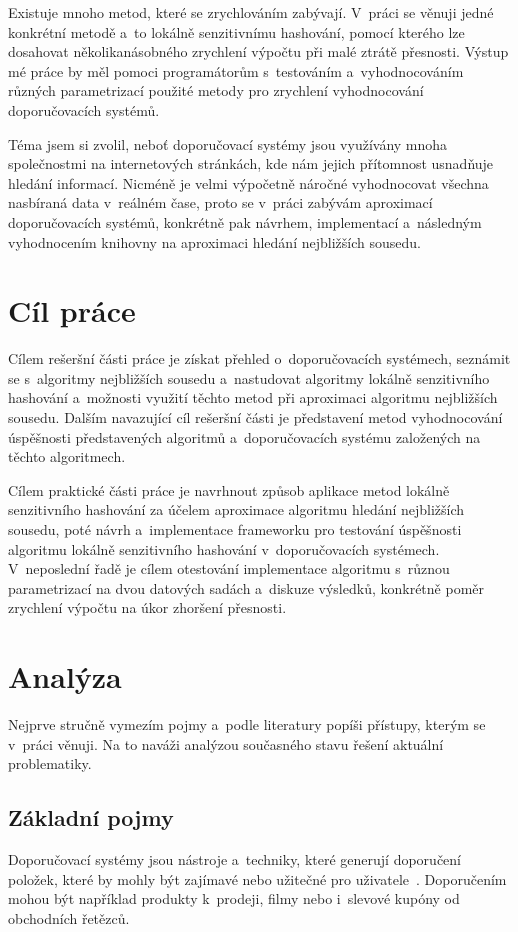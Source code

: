 \documentclass[11pt]{article}
\begin{document}
Existuje mnoho metod, které se zrychlováním zabývají. V~práci se věnuji
jedné konkrétní metodě a~to lokálně senzitivnímu hashování, pomocí kterého lze dosahovat několikanásobného zrychlení výpočtu při malé ztrátě přesnosti. Výstup mé práce by měl pomoci programátorům s~testováním a~vyhodnocováním různých parametrizací použité metody pro zrychlení vyhodnocování doporučovacích systémů.

Téma jsem si zvolil, neboť doporučovací systémy jsou využívány mnoha
společnostmi na internetových stránkách, kde nám jejich přítomnost usnadňuje
hledání informací. Nicméně je velmi výpočetně náročné vyhodnocovat
všechna nasbíraná data v~reálném čase, proto se v~práci zabývám aproximací doporučovacích systémů, konkrétně pak návrhem, implementací a~následným vyhodnocením knihovny na aproximaci hledání nejbližších sousedu.

\section{Cíl práce}
Cílem rešeršní části práce je získat přehled o~doporučovacích systémech, seznámit se s~algoritmy nejbližších sousedu a~nastudovat algoritmy lokálně senzitivního hashování a~možnosti využití těchto metod při aproximaci algoritmu nejbližších sousedu. Dalším navazující cíl rešeršní části je představení metod vyhodnocování úspěšnosti představených algoritmů a~doporučovacích systému založených na těchto algoritmech.

Cílem praktické části práce je navrhnout způsob aplikace metod lokálně
senzitivního hashování za účelem aproximace algoritmu hledání nejbližších
sousedu, poté návrh a~implementace frameworku pro testování úspěšnosti
algoritmu lokálně senzitivního hashování v~doporučovacích systémech. V~neposlední řadě je cílem otestování implementace algoritmu s~různou parametrizací na dvou datových sadách a~diskuze výsledků, konkrétně poměr zrychlení výpočtu na úkor zhoršení přesnosti.

\section{Analýza}
Nejprve stručně vymezím pojmy a~podle literatury popíši přístupy, kterým se v~práci věnuji. Na to naváži analýzou současného stavu řešení aktuální problematiky.

\subsection{Základní pojmy}
Doporučovací systémy jsou nástroje a~techniky, které generují doporučení položek, které by mohly být zajímavé nebo užitečné pro uživatele~\cite[pg.1]{RECHAndBook}. Doporučením mohou být například produkty k~prodeji, filmy nebo i~slevové kupóny od obchodních řetězců.
\end{document}
